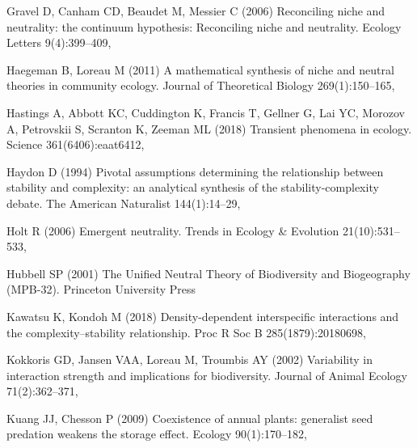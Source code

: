 \documentclass[smallcondensed,referee]{svjour3}       %
\begin{document}
\begin{thebibliography}{56}
Gravel D, Canham CD, Beaudet M, Messier C (2006) Reconciling niche and
  neutrality: the continuum hypothesis: {Reconciling} niche and neutrality.
  Ecology Letters 9(4):399--409, 

Haegeman B, Loreau M (2011) A mathematical synthesis of niche and neutral
  theories in community ecology. Journal of Theoretical Biology
  269(1):150--165, 

Hastings A, Abbott KC, Cuddington K, Francis T, Gellner G, Lai YC, Morozov A,
  Petrovskii S, Scranton K, Zeeman ML (2018) Transient phenomena in ecology.
  Science 361(6406):eaat6412, 

Haydon D (1994) Pivotal assumptions determining the relationship between
  stability and complexity: an analytical synthesis of the stability-complexity
  debate. The American Naturalist 144(1):14--29, 

Holt R (2006) Emergent neutrality. Trends in Ecology \& Evolution
  21(10):531--533, 

Hubbell SP (2001) The {Unified} {Neutral} {Theory} of {Biodiversity} and
  {Biogeography} ({MPB}-32). Princeton University Press

Kawatsu K, Kondoh M (2018) Density-dependent interspecific interactions and the
  complexity--stability relationship. Proc R Soc B 285(1879):20180698,

Kokkoris GD, Jansen VAA, Loreau M, Troumbis AY (2002) Variability in
  interaction strength and implications for biodiversity. Journal of Animal
  Ecology 71(2):362--371, 

Kuang JJ, Chesson P (2009) Coexistence of annual plants: generalist seed
  predation weakens the storage effect. Ecology 90(1):170--182,


\end{thebibliography}
\end{document}
